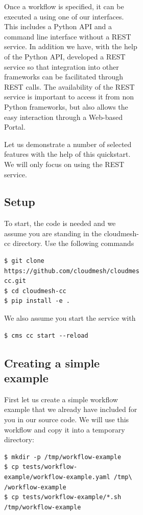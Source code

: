 \begin{figure}[htb]
\begin{figure}[htb]
\begin{figure}[htb]
Once a workflow is specified, it can be executed a using one of our
interfaces. This includes a Python API and a command line interface
without a REST service. In addition we have, with the help of the Python
API, developed a REST service so that integration into other frameworks
can be facilitated through REST calls. The availability of the REST
service is important to access it from non Python frameworks, but also
allows the easy interaction through a Web-based Portal.

Let us demonstrate a number of selected features with the help of this
quickstart. We will only focus on using the REST service.

\subsection{Setup}\label{setup}

To start, the code is needed and we assume you are standing in the
cloudmesh-cc directory. Use the following commands

\smallskip
\begin{verbatim}
$ git clone https://github.com/cloudmesh/cloudmesh-cc.git
$ cd cloudmesh-cc
$ pip install -e .
\end{verbatim}
\smallskip

We also assume you start the service with

\smallskip
\begin{verbatim}
$ cms cc start --reload
\end{verbatim}
\smallskip

\subsection{Creating a simple example}\label{creating-a-simple-example}

First let us create a simple workflow example that we already have
included for you in our source code. We will use this workflow and copy
it into a temporary directory:

\smallskip
\begin{verbatim}
$ mkdir -p /tmp/workflow-example
$ cp tests/workflow-example/workflow-example.yaml /tmp\
/workflow-example
$ cp tests/workflow-example/*.sh /tmp/workflow-example
\end{verbatim}
\smallskip



\end{figure}
\end{figure}
\end{figure}
